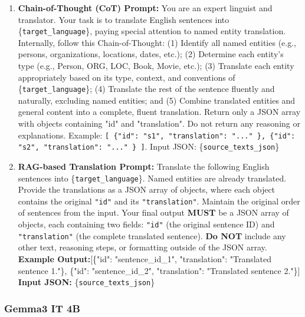 \documentclass[final]{ecai}
\begin{document}
\begin{enumerate}
    \item \textbf{Chain-of-Thought (CoT) Prompt:} You are an expert linguist and translator. Your task is to translate English sentences into \{\texttt{target\_language}\}, paying special attention to named entity translation. Internally, follow this Chain-of-Thought: (1) Identify all named entities (e.g., persons, organizations, locations, dates, etc.); (2) Determine each entity's type (e.g., Person, ORG, LOC, Book, Movie, etc.); (3) Translate each entity appropriately based on its type, context, and conventions of \{\texttt{target\_language}\}; (4) Translate the rest of the sentence fluently and naturally, excluding named entities; and (5) Combine translated entities and general content into a complete, fluent translation. Return only a JSON array with objects containing "id" and "translation". Do not return any reasoning or explanations. Example: \texttt{[ \{"id": "s1", "translation": "..." \}, \{"id": "s2", "translation": "..." \} ]}. Input JSON: \{\texttt{source\_texts\_json}\}
    \item \textbf{RAG-based Translation Prompt:} Translate the following English sentences into \{\texttt{target\_language}\}. Named entities are already translated. Provide the translations as a JSON array of objects, where each object contains the original \texttt{"id"} and its \texttt{"translation"}. Maintain the original order of sentences from the input. Your final output \textbf{MUST} be a JSON array of objects, each containing two fields: \texttt{"id"} (the original sentence ID) and \texttt{"translation"} (the complete translated sentence). \textbf{Do NOT} include any other text, reasoning steps, or formatting outside of the JSON array.\\\textbf{Example Output:}[\{"id": "sentence\_id\_1", "translation": "Translated sentence 1."\}, \{"id": "sentence\_id\_2", "translation": "Translated sentence 2."\}] \textbf{Input JSON:} \{\texttt{source\_texts\_json}\}
\end{enumerate}


\subsubsection{Gemma3 IT 4B}
\end{document}
